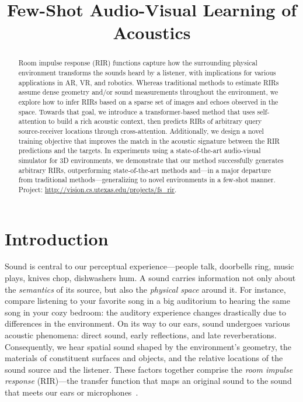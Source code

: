\title{Few-Shot Audio-Visual Learning of Acoustics}

\begin{abstract}
Room impulse response (RIR) functions capture how the surrounding physical environment transforms the sounds heard by a listener, with implications for various applications in AR, VR, and robotics.  Whereas traditional methods to estimate RIRs assume  dense geometry and/or sound measurements throughout the environment, we explore how to infer RIRs based on a sparse set of images and echoes observed in the space. Towards that goal, we introduce a transformer-based method that uses self-attention to build a rich acoustic context, then predicts RIRs of arbitrary query source-receiver locations through cross-attention. Additionally, we design a novel training objective that improves the match in the acoustic signature between the RIR predictions and the targets. In experiments using a state-of-the-art audio-visual simulator for 3D environments, we demonstrate that our method successfully generates arbitrary RIRs, outperforming state-of-the-art methods and---in a major departure from traditional methods---generalizing to novel environments in a few-shot manner. Project: 
\url{http://vision.cs.utexas.edu/projects/fs_rir}.
\end{abstract}

\section{Introduction}

Sound is central to our perceptual experience---people talk, doorbells ring, music plays, knives chop, dishwashers hum.  A sound carries information not only about the \emph{semantics} of its source, but also the \emph{physical space} around it. For instance, compare listening to your favorite song in a big auditorium to hearing the same song in your cozy bedroom: the auditory experience changes drastically due to differences in the environment. On its way to our ears, sound undergoes various acoustic phenomena: direct sound, early reflections, and late reverberations. Consequently, we hear spatial sound shaped by the environment's geometry, the materials of constituent surfaces and objects, and the relative locations of the sound source and the listener. These factors together comprise the \emph{room impulse response} (RIR)---the transfer function that maps an original sound to the sound that meets our ears or microphones~\citep{62e5b0bcac3243f0b77291509411ed52}.

